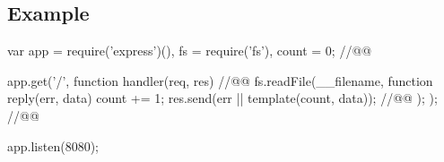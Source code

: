 




\subsection{Example}

\begin{code}[js,
  caption={Example web application},
  label={lst:source}]
var app = require('express')(),
    fs = require('fs'),
    count = 0; //@\label{lst:source-counter}@

app.get('/', function handler(req, res){ //@\label{lst:source-handler}@
  fs.readFile(__filename, function reply(err, data) {
    count += 1;
    res.send(err || template(count, data)); //@\label{lst:source-send}@
  });
}); //@\label{lst:source-handler-end}@

app.listen(8080);
\end{code}

